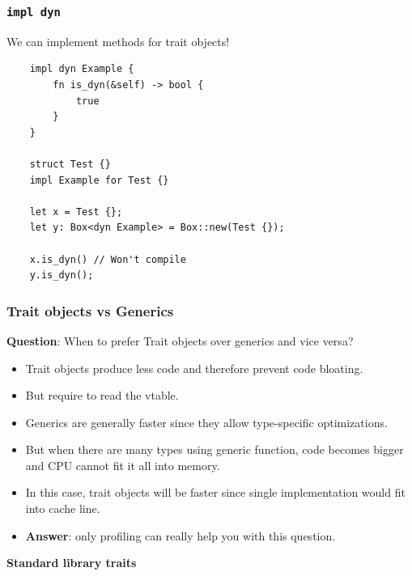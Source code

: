 \documentclass[aspectratio=1610,t]{beamer}
\begin{document}

\begin{frame}[fragile]
\frametitle{\texttt{impl dyn}}
We can implement methods for trait objects!

\begin{verbatim}
    impl dyn Example {
        fn is_dyn(&self) -> bool {
            true
        }
    }

    struct Test {}
    impl Example for Test {}

    let x = Test {};
    let y: Box<dyn Example> = Box::new(Test {});
    
    x.is_dyn() // Won't compile
    y.is_dyn();
\end{verbatim}
\end{frame}


\begin{frame}[fragile]
\frametitle{Trait objects vs Generics}
\textbf{Question}: When to prefer Trait objects over generics and vice versa?

\begin{itemize}
    \item<2-> Trait objects produce less code and therefore prevent code bloating.
    \item<3-> But require to read the vtable.
    \item<4-> Generics are generally faster since they allow type-specific optimizations.
    \item<5-> But when there are many types using generic function, code becomes bigger and CPU cannot fit it all into memory.
    \item<6-> In this case, trait objects will be faster since single implementation would fit into cache line.
    \item<7-> \textbf{Answer}: only profiling can really help you with this question. 
\end{itemize}
\end{frame}


\begin{frame}[c]
\centering\Huge\textbf{Standard library traits}
\end{frame}

\end{document}
